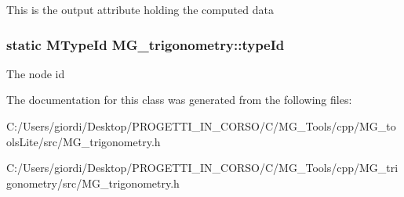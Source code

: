 This is the output attribute holding the computed data \hypertarget{class_m_g__trigonometry_a9d74e233bd966adb8c060c4aae7a6576}{
\subsubsection[{type\-Id}]{\setlength{\rightskip}{0pt plus 5cm}static M\-Type\-Id M\-G\-\_\-trigonometry\-::type\-Id\hspace{0.3cm}{\ttfamily [static]}}}\label{class_m_g__trigonometry_a9d74e233bd966adb8c060c4aae7a6576}
The node id 

The documentation for this class was generated from the following files\-:\begin{DoxyCompactItemize}
\item 
C\-:/\-Users/giordi/\-Desktop/\-P\-R\-O\-G\-E\-T\-T\-I\-\_\-\-I\-N\-\_\-\-C\-O\-R\-S\-O/\-C/\-M\-G\-\_\-\-Tools/cpp/\-M\-G\-\_\-tools\-Lite/src/M\-G\-\_\-trigonometry.\-h\item 
C\-:/\-Users/giordi/\-Desktop/\-P\-R\-O\-G\-E\-T\-T\-I\-\_\-\-I\-N\-\_\-\-C\-O\-R\-S\-O/\-C/\-M\-G\-\_\-\-Tools/cpp/\-M\-G\-\_\-trigonometry/src/M\-G\-\_\-trigonometry.\-h\end{DoxyCompactItemize}
